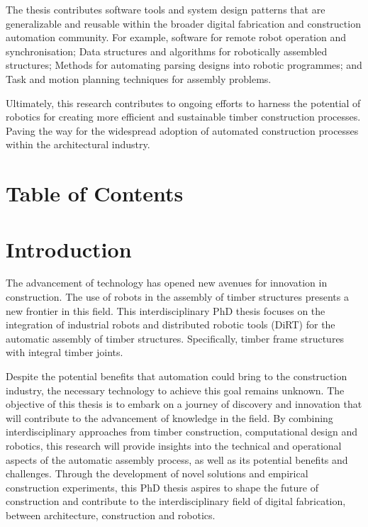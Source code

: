 \documentclass[11pt]{book}
\begin{document}
The thesis contributes software tools and system design patterns that are generalizable and reusable within the broader digital fabrication and construction automation community. For example, software for remote robot operation and synchronisation; Data structures and algorithms for robotically assembled structures; Methods for automating parsing designs into robotic programmes; and Task and motion planning techniques for assembly problems.

Ultimately, this research contributes to ongoing efforts to harness the potential of robotics for creating more efficient and sustainable timber construction processes. Paving the way for the widespread adoption of automated construction processes within the architectural industry.


\newpage

\chapter{Table of Contents}


\tableofcontents
\vspace{1\baselineskip}

\newpage

\chapter{Introduction}

The advancement of technology has opened new avenues for innovation in construction. The use of robots in the assembly of timber structures presents a new frontier in this field. This interdisciplinary PhD thesis focuses on the integration of industrial robots and distributed robotic tools (DiRT) for the automatic assembly of timber structures. Specifically, timber frame structures with integral timber joints. 

Despite the potential benefits that automation could bring to the construction industry, the necessary technology to achieve this goal remains unknown. The objective of this thesis is to embark on a journey of discovery and innovation that will contribute to the advancement of knowledge in the field. By combining interdisciplinary approaches from timber construction, computational design and robotics, this research will provide insights into the technical and operational aspects of the automatic assembly process, as well as its potential benefits and challenges. Through the development of novel solutions and empirical construction experiments, this PhD thesis aspires to shape the future of construction and contribute to the interdisciplinary field of digital fabrication, between architecture, construction and robotics.
\end{document}

